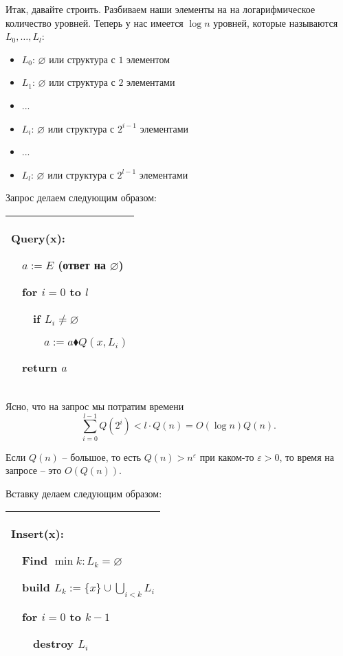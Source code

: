 Итак, давайте строить. Разбиваем наши элементы на на логарифмическое количество уровней. Теперь у нас имеется $\log n $ уровней, которые называются $L_0,\ldots,L_l$: \begin{itemize}
    \item $L_0$: $\varnothing$ или структура с $1$ элементом

    \item $L_1$: $\varnothing$ или структура с $2$ элементами

    \item ...

    \item $L_i$: $\varnothing$ или структура с $2^{i-1}$ элементами

    \item ...

    \item $L_l$: $\varnothing$ или структура с $2^{l-1}$ элементами

\end{itemize}

Запрос делаем следующим образом:

\begin{tabular}{|p{4cm}|}
\hline
Query(x):

$\quad$$a:=E$ (ответ на $\varnothing$)

$\quad$for $i=0$ to $l$

$\quad$$\quad$if $L_i \ne \varnothing$

$\quad$$\quad$$\quad$$a:=a\blacklozenge Q(x,L_i)$

$\quad$return $a$\\
\hline
\end{tabular}


Ясно, что на запрос мы потратим времени $$\sum_{i=0}^{l-1}Q(2^i)<l\cdot Q(n)=O(\log n)Q(n).$$

\begin{remark}
Если $Q(n)$ -- большое, то есть $Q(n)>n^\varepsilon$ при каком-то $\varepsilon >0$, то время на запросе -- это $O(Q(n))$.
\end{remark} 

Вставку делаем следующим образом:

\begin{tabular}{|p{5cm}|}
\hline
Insert(x):

$\quad$Find $\min k: L_k=\varnothing$

$\quad$build $L_k:=\{x\}\cup \bigcup_{i<k} L_i$

$\quad$for $i=0$ to $k-1$ 

$\quad$$\quad$destroy $L_i$\\

\hline
\end{tabular}

